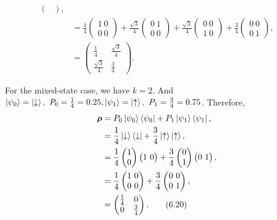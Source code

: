 \documentclass{article}
\begin{document}
\begin{align*}
\begin{pmatrix}
    \end{pmatrix},\\
    &=\frac{1}{4}\begin{pmatrix}
        1 \ 0 \\ 0\ 0
    \end{pmatrix}
    +\frac{\sqrt{3}}{4}\begin{pmatrix}
        0 \ 1 \\ 0 \ 0
    \end{pmatrix}+
    \frac{\sqrt{3}}{4}\begin{pmatrix}
        0 \ 0 \\ 1 \ 0
    \end{pmatrix}+
    \frac{3}{4}\begin{pmatrix}
        0 \ 0 \\ 0\ 1
    \end{pmatrix},\\
    &=\begin{pmatrix}
        \frac{1}{4} & \frac{\sqrt{3}}{4}\\
        \frac{\sqrt{3}}{4} & \frac{3}{4}
    \end{pmatrix}.\tag{6.19}
\end{align*}

For the mixed-state case, we have $k=2$. And $\ket{\psi_0}=\ket{\downarrow},\ P_0=\frac{1}{4}=0.25,
\ket{\psi_1}=\ket{\uparrow},\ P_1=\frac{3}{4}=0.75$. Therefore,
\begin{align*} \label{eq 6.20}
    \boldsymbol{\rho}&=P_0\ket{\psi_0}\bra{\psi_0}+P_1\ket{\psi_1}\bra{\psi_1},\\
    &=\frac{1}{4}\ket{\downarrow}\bra{\downarrow}+\frac{3}{4}\ket{\uparrow}\ket{\uparrow},\\
    &=\frac{1}{4}\begin{pmatrix}
        1\\0
    \end{pmatrix}
    \begin{pmatrix}
        1 \ 0
    \end{pmatrix}+\frac{3}{4}
    \begin{pmatrix}
        0\\1
    \end{pmatrix}
    \begin{pmatrix}
        0 \ 1
    \end{pmatrix},\\
    &=\frac{1}{4}\begin{pmatrix}
        1 \ 0 \\ 0\ 0
    \end{pmatrix}+
    \frac{3}{4}\begin{pmatrix}
        0\ 0\\ 0\ 1
    \end{pmatrix},\\
    &=\begin{pmatrix}
        \frac{1}{4} & 0\\
        0& \frac{3}{4}
    \end{pmatrix}. \tag{6.20}
\end{align*}
\end{document}
